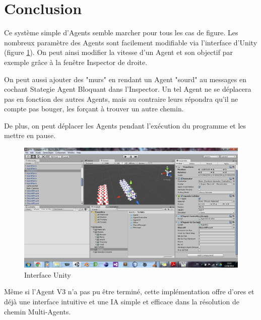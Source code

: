 \documentclass[11pt]{article}
\begin{document}
  \section{Conclusion}
  
  Ce système simple d'Agents semble marcher pour tous les cas de figure.
  Les nombreux paramètre des Agents sont facilement modifiable via l'interface d'Unity (figure \ref{fig:unity}). On peut ainsi modifier la vitesse d'un Agent et son objectif par exemple grâce à la fenêtre Inspector de droite.
 
 On peut aussi ajouter des "murs" en rendant un Agent "sourd" au messages en cochant Stategie Agent Bloquant dans l'Inspector. 
  Un tel Agent ne se déplacera pas en fonction des autres Agents, mais au contraire leurs répondra qu'il ne compte pas bouger, les forçant à trouver un autre chemin.
  
  
  De plus, on peut déplacer les Agents pendant l'exécution du programme et les mettre en pause.
  
  \begin{figure}[H]
      \centering
      \includegraphics[scale=0.4]{Image/unity.png} 
      \caption{Interface Unity}
      \label{fig:unity}
  \end{figure}
  
  
  Même si l'Agent V3 n'a pas pu être terminé, cette implémentation offre d'ores et déjà une interface intuitive et une IA simple et efficace dans la résolution de chemin Multi-Agents. 
  

  
  
\end{document}
